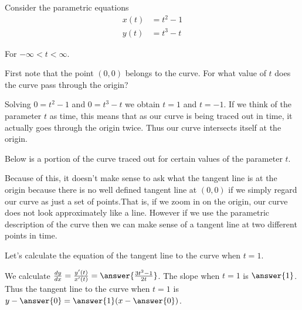 \documentclass{ximera}
\author{Jason Miller}
\begin{document}
\begin{exercise}
Consider the parametric equations 
\begin{align*}
x(t) &= t^2-1\\
y(t) &= t^3-t
\end{align*}

For $-\infty < t < \infty$.

First note that the point $(0,0)$ belongs to the curve. For what value of $t$ does the curve pass through the origin?

Solving $0=t^2-1$ and $0=t^3-t$ we obtain $t=1$ and $t=-1$. If we think of the parameter $t$ as time, this means that as our 
curve is being traced out in time, it actually goes through the origin twice. Thus our curve intersects itself at the origin. 

Below is a portion of the curve traced out for certain values of the parameter $t$.

\begin{image}  
\end{image} 



Because of this, it doesn't make sense to ask what the tangent line is at the origin because there is no well defined tangent line at $(0,0)$ if we simply regard our curve as just a set of points.That is, if we zoom in on the origin, our curve does not look approximately like a line. However if we use the parametric description of the curve then we can make sense of a tangent line at two different points in time. 

Let's calculate the equation of the tangent line to the curve when $t=1$. 

We calculate $\dd[y]{x}=\frac{y'(t)}{x'(t)}=\answer{ \frac{3t^2-1}{2t}}$. The slope when $t=1$ is $\answer{1}$. Thus the tangent line to the curve when $t=1$ is
$y-\answer{0}=\answer{1}(x-\answer{0})$. 


\end{exercise}
\end{document}
